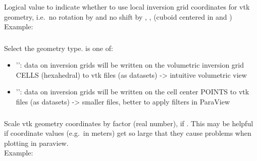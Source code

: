 \subsubsection{}
Logical value to indicate whether to use local inversion grid coordinates for vtk geometry, i.e.\ no rotation 
by  and no shift by , , 
 (cuboid centered in  and )\\
Example:\\
\subsubsection{}
Select the geometry type.  is one of:
\begin{itemize}
\item[]'': data on inversion grids will be written on the volumetric inversion grid CELLS (hexahedral) to vtk files (as  datasets) -> intuitive volumetric view
\item[]'': data on inversion grids will be written on the cell center POINTS to vtk files (as  datasets) -> smaller files, better to apply filters in ParaView
\end{itemize}
\subsubsection{}
Scale vtk geometry coordinates by factor  (real number), if 
. This may be helpful if coordinate values (e.g.\ in meters) 
get so large that they cause problems when plotting in paraview.\\
Example:\\
\\
%
